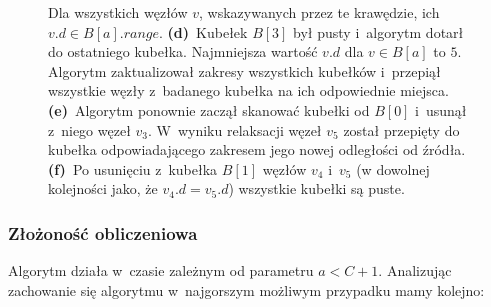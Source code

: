 \begin{figure}[!htbp]
{		Dla wszystkich węzłów $v$, wskazywanych przez te krawędzie, ich $v.d \in B \left[ a \right].range$.
		\textbf{(d)}~Kubełek $B \left[ 3 \right]$ był pusty i~algorytm dotarł do ostatniego kubełka.
		Najmniejsza wartość $v.d$ dla $v \in B \left[ a \right]$ to $5$.
		Algorytm zaktualizował zakresy wszystkich kubełków i~przepiął wszystkie węzły z~badanego kubełka na ich odpowiednie miejsca.
		\textbf{(e)}~Algorytm ponownie zaczął skanować kubełki od $B \left[ 0 \right]$ i~usunął z~niego węzeł $v_{3}$.
		W~wyniku relaksacji węzeł $v_{5}$ został przepięty do kubełka odpowiadającego zakresem jego nowej odległości od źródła.
		\textbf{(f)}~Po usunięciu z~kubełka $B \left[ 1 \right]$ węzłów $v_{4}$ i~$v_{5}$ (w dowolnej kolejności jako, że $v_{4}.d = v_{5}.d$) wszystkie kubełki są puste.
	}
	\label{fig:exampleOverflowBucket}
\end{figure}


\subsubsection{Złożoność obliczeniowa}


Algorytm działa w~czasie zależnym od parametru $a < C + 1$.
Analizując zachowanie się algorytmu w~najgorszym możliwym przypadku mamy kolejno:

